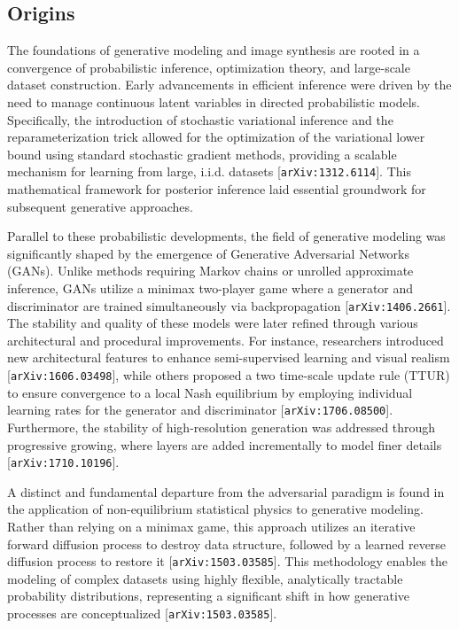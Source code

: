 \documentclass[11pt]{article}
\begin{document}
\subsection{Origins}

The foundations of generative modeling and image synthesis are rooted in a convergence of probabilistic inference, optimization theory, and large-scale dataset construction. Early advancements in efficient inference were driven by the need to manage continuous latent variables in directed probabilistic models. Specifically, the introduction of stochastic variational inference and the reparameterization trick allowed for the optimization of the variational lower bound using standard stochastic gradient methods, providing a scalable mechanism for learning from large, i.i.d. datasets [\texttt{arXiv:1312.6114}]. This mathematical framework for posterior inference laid essential groundwork for subsequent generative approaches.

Parallel to these probabilistic developments, the field of generative modeling was significantly shaped by the emergence of Generative Adversarial Networks (GANs). Unlike methods requiring Markov chains or unrolled approximate inference, GANs utilize a minimax two-player game where a generator and discriminator are trained simultaneously via backpropagation [\texttt{arXiv:1406.2661}]. The stability and quality of these models were later refined through various architectural and procedural improvements. For instance, researchers introduced new architectural features to enhance semi-supervised learning and visual realism [\texttt{arXiv:1606.03498}], while others proposed a two time-scale update rule (TTUR) to ensure convergence to a local Nash equilibrium by employing individual learning rates for the generator and discriminator [\texttt{arXiv:1706.08500}]. Furthermore, the stability of high-resolution generation was addressed through progressive growing, where layers are added incrementally to model finer details [\texttt{arXiv:1710.10196}].

A distinct and fundamental departure from the adversarial paradigm is found in the application of non-equilibrium statistical physics to generative modeling. Rather than relying on a minimax game, this approach utilizes an iterative forward diffusion process to destroy data structure, followed by a learned reverse diffusion process to restore it [\texttt{arXiv:1503.03585}]. This methodology enables the modeling of complex datasets using highly flexible, analytically tractable probability distributions, representing a significant shift in how generative processes are conceptualized [\texttt{arXiv:1503.03585}].
\end{document}
